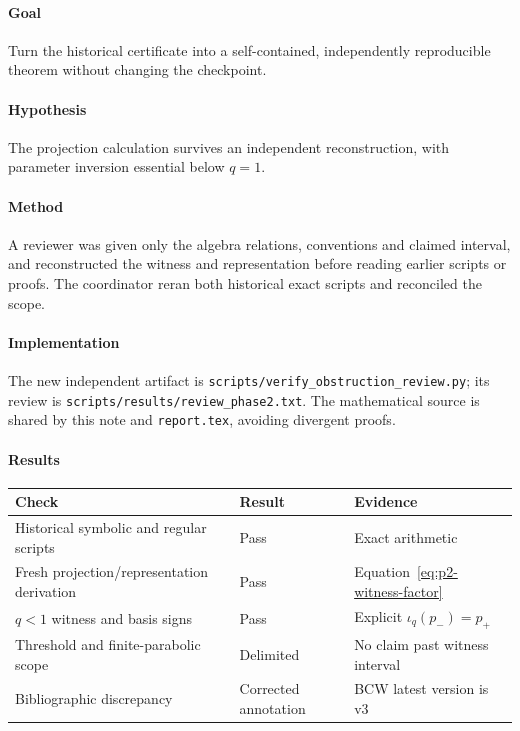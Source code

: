 \paragraph{Goal} Turn the historical certificate into a self-contained,
independently reproducible theorem without changing the checkpoint.
\paragraph{Hypothesis} The projection calculation survives an independent
reconstruction, with parameter inversion essential below $q=1$.
\paragraph{Method} A reviewer was given only the algebra relations,
conventions and claimed interval, and reconstructed the witness and
representation before reading earlier scripts or proofs. The coordinator
reran both historical exact scripts and reconciled the scope.
\paragraph{Implementation} The new independent artifact is
\texttt{scripts/verify\_obstruction\_review.py}; its review is
\texttt{scripts/results/review\_phase2.txt}. The mathematical source is
shared by this note and \texttt{report.tex}, avoiding divergent proofs.
\paragraph{Results}
{\setlength{\tabcolsep}{8pt}\renewcommand{\arraystretch}{1.2}
\begin{tabular}{lll}\toprule
Check & Result & Evidence\\\midrule
Historical symbolic and regular scripts & Pass & Exact arithmetic\\
Fresh projection/representation derivation & Pass & Equation~\eqref{eq:p2-witness-factor}\\
$q<1$ witness and basis signs & Pass & Explicit $\iota_q(p_-)=p_+$\\
Threshold and finite-parabolic scope & Delimited & No claim past witness interval\\
Bibliographic discrepancy & Corrected annotation & BCW latest version is v3\\\bottomrule
\end{tabular}}
